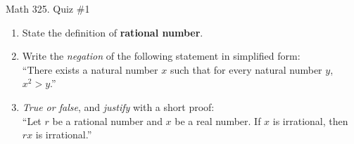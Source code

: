 \documentclass[12pt]{amsart}
\begin{document}
	
	\thispagestyle{empty}
	
	\begin{center}
		\Large{Math 325. Quiz \#1 }\\

	\end{center}
	
	
	
	\bigskip
	
	\begin{enumerate}
	
	\item State the definition of \textbf{rational number}.
	
	\vfill\vfill
	
	\item Write the \emph{negation} of the following statement in simplified form: \\
``There exists a natural number $x$ such that for every natural number $y$, $x^2>y$.''

\vfill\vfill

\item  \emph{True or false}, and \emph{justify} with a short proof:\\
``Let $r$ be a rational number and $x$ be a real number. If $x$ is irrational, then $rx$ is irrational.''
		
\vfill\vfill\vfill





\end{enumerate}


	
	
\end{document}

